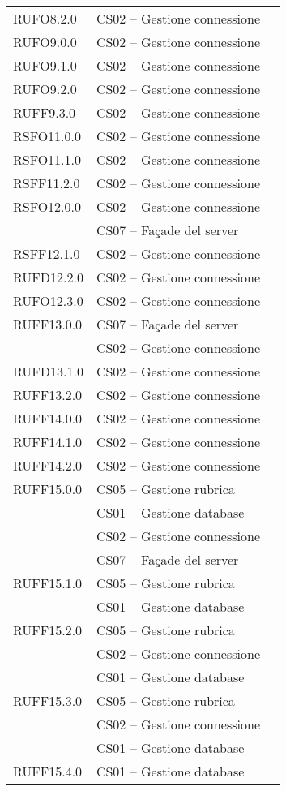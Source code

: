 \begin{center}
\begin{longtable}{lp{}l}
RUFO8.2.0 & CS02 -- Gestione connessione \\
RUFO9.0.0 & CS02 -- Gestione connessione \\
RUFO9.1.0 & CS02 -- Gestione connessione \\
RUFO9.2.0 & CS02 -- Gestione connessione \\
RUFF9.3.0 & CS02 -- Gestione connessione \\
RSFO11.0.0 & CS02 -- Gestione connessione \\
RSFO11.1.0 & CS02 -- Gestione connessione \\
RSFF11.2.0 & CS02 -- Gestione connessione \\
RSFO12.0.0 & CS02 -- Gestione connessione \\
 & CS07 -- Façade del server \\
RSFF12.1.0 & CS02 -- Gestione connessione \\
RUFD12.2.0 & CS02 -- Gestione connessione \\
RUFO12.3.0 & CS02 -- Gestione connessione \\
RUFF13.0.0 & CS07 -- Façade del server \\
 & CS02 -- Gestione connessione \\
RUFD13.1.0 & CS02 -- Gestione connessione \\
RUFF13.2.0 & CS02 -- Gestione connessione \\
RUFF14.0.0 & CS02 -- Gestione connessione \\
RUFF14.1.0 & CS02 -- Gestione connessione \\
RUFF14.2.0 & CS02 -- Gestione connessione \\
RUFF15.0.0 & CS05 -- Gestione rubrica \\
 & CS01 -- Gestione database \\
 & CS02 -- Gestione connessione \\
 & CS07 -- Façade del server \\
RUFF15.1.0 & CS05 -- Gestione rubrica \\
 & CS01 -- Gestione database \\
RUFF15.2.0 & CS05 -- Gestione rubrica \\
 & CS02 -- Gestione connessione \\
 & CS01 -- Gestione database \\
RUFF15.3.0 & CS05 -- Gestione rubrica \\
 & CS02 -- Gestione connessione \\
 & CS01 -- Gestione database \\
RUFF15.4.0 & CS01 -- Gestione database \\

\end{longtable}
\end{center}
